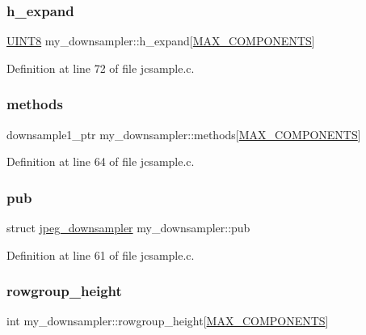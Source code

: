 \subsubsection{\texorpdfstring{h\_expand}{h\_expand}}
{\footnotesize\ttfamily \mbox{\hyperlink{jmorecfg_8h_adfb9a8ea1dd59f151065f763e1e9acd6}{U\+I\+N\+T8}} my\+\_\+downsampler\+::h\+\_\+expand\mbox{[}\mbox{\hyperlink{jmorecfg_8h_a6d8c910a1fdb6d4762a05f7250e64322}{M\+A\+X\+\_\+\+C\+O\+M\+P\+O\+N\+E\+N\+TS}}\mbox{]}}



Definition at line 72 of file jcsample.\+c.

\mbox{\label{structmy__downsampler_a6e74bc63d21fbd97d92dc36f65011a75}} 
\subsubsection{\texorpdfstring{methods}{methods}}
{\footnotesize\ttfamily downsample1\+\_\+ptr my\+\_\+downsampler\+::methods\mbox{[}\mbox{\hyperlink{jmorecfg_8h_a6d8c910a1fdb6d4762a05f7250e64322}{M\+A\+X\+\_\+\+C\+O\+M\+P\+O\+N\+E\+N\+TS}}\mbox{]}}



Definition at line 64 of file jcsample.\+c.

\mbox{\label{structmy__downsampler_a3ace227dd4fd9fdf8e8fe542ca6503c3}} 
\subsubsection{\texorpdfstring{pub}{pub}}
{\footnotesize\ttfamily struct \mbox{\hyperlink{structjpeg__downsampler}{jpeg\+\_\+downsampler}} my\+\_\+downsampler\+::pub}



Definition at line 61 of file jcsample.\+c.

\mbox{\label{structmy__downsampler_a60c30dd6034e706ee9d21d0f5f198af7}} 
\subsubsection{\texorpdfstring{rowgroup\_height}{rowgroup\_height}}
{\footnotesize\ttfamily int my\+\_\+downsampler\+::rowgroup\+\_\+height\mbox{[}\mbox{\hyperlink{jmorecfg_8h_a6d8c910a1fdb6d4762a05f7250e64322}{M\+A\+X\+\_\+\+C\+O\+M\+P\+O\+N\+E\+N\+TS}}\mbox{]}}



